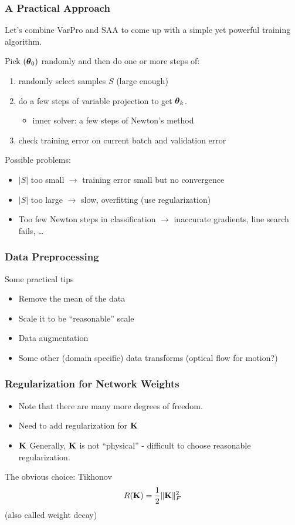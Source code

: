\documentclass[12pt,fleqn]{beamer}
\begin{document}
\begin{frame}
	\frametitle{A Practical Approach}
	
	Let's combine VarPro and SAA to come up with a simple yet powerful training algorithm.
	
	\bigskip
	\pause
	
	Pick $({\boldsymbol \theta}_0)$ randomly and then do one or more steps of:
	\begin{enumerate}
		\item randomly select samples $S$ (large enough)
		\item do a few steps of variable projection to get ${\boldsymbol \theta}_k$.
		\begin{itemize}
			\item inner solver: a few steps of Newton's method
		\end{itemize}
		\item check training error on current batch and validation error
	\end{enumerate}
	
	\bigskip
	\pause
	
	Possible problems:
	\begin{itemize}
		\item $|S|$ too small $\rightarrow$ training error small but no convergence
		\item $|S|$ too large $\rightarrow$ slow, overfitting (use regularization)
		\item Too few Newton steps in classification $\rightarrow$ inaccurate gradients, line search fails, \ldots
	\end{itemize}	
\end{frame}

\begin{frame}[fragile]\frametitle{Data Preprocessing}

Some practical tips
\begin{itemize}
\item Remove the mean of the data
\item Scale it to be ``reasonable'' scale
\item Data augmentation
\item Some other (domain specific) data transforms (optical flow for motion?)
\end{itemize}

\end{frame}

\begin{frame}[fragile]\frametitle{Regularization for Network Weights}

\begin{itemize}
\item
Note that there are many more degrees of freedom.
\item
Need to add regularization for ${\bf K}$
\item
${\bf K}$ Generally, ${\bf K}$ is not ``physical'' - difficult to choose reasonable
regularization.
\end{itemize}

\bigskip

The obvious choice: Tikhonov
$$ R({\bf K}) = {\frac 12} \|{\bf K}\|^2_F $$
(also called weight decay)


\end{frame}
\end{document}
